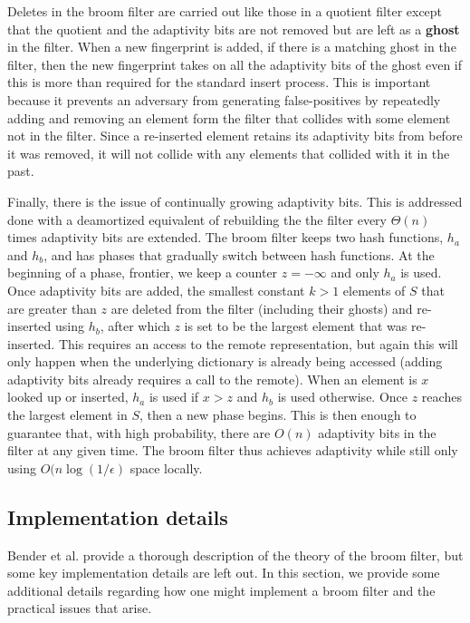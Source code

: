 \documentclass[../paper.tex]{subfiles}
\begin{document}
Deletes in the broom filter are carried out like
those in a quotient filter except that the quotient and the adaptivity
bits are not removed but are left as a {\bf ghost} in the filter.  When a
new fingerprint is added, if there is a matching ghost in the filter, then
the new fingerprint takes on all the adaptivity bits of the ghost even  if
this is more than required for the standard insert process. 
This is important because it prevents an adversary from generating false-positives
by repeatedly adding and removing an element form the filter that collides with
some element not in the filter. Since a re-inserted element retains its
adaptivity bits from before it was removed, it will not collide with any
elements that collided with it in the past.

Finally, there is the issue of continually growing adaptivity bits.
This is addressed done with a deamortized equivalent of rebuilding the the filter
every $\Theta (n)$ times adaptivity bits are extended. The broom filter keeps
two hash functions, $h_a$ and $h_b$, and has phases that
gradually switch between hash functions.  At the beginning of a phase,
frontier, we keep a counter $z = -\infty$ and only $h_a$ is used.  Once adaptivity bits are
added, the smallest constant $k > 1$ elements of $S$ that are greater than
$z$ are deleted from the filter (including their ghosts) and re-inserted
using $h_b$, after which $z$ is set to be the largest element that was
re-inserted.  This requires an access to the remote representation, but
again this will only happen when the underlying dictionary is already
being accessed (adding adaptivity bits already requires a call to the remote).
When an element is $x$ looked up or inserted, $h_a$ is
used if $x > z$ and $h_b$ is used otherwise.  Once $z$ reaches the largest
element in $S$, then a new phase begins.  This is then enough to guarantee
that, with high probability, there are $O(n)$ adaptivity bits in the
filter at any given time.  The broom filter thus achieves adaptivity while
still only using $O(n \log (1/\epsilon)$ space locally.  

\subsection{Implementation details}

Bender et al. \cite{broom-filter} provide a thorough description of the theory of
the broom filter, but some key implementation details are left out. In this section,
we provide some additional details regarding how one might implement a broom filter
and the practical issues that arise.
\end{document}
